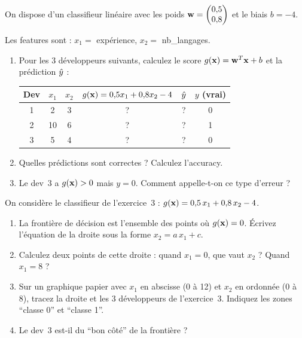 
On dispose d'un classifieur lin\'{e}aire avec les poids
$\mathbf{w} = \begin{pmatrix} 0{,}5 \\ 0{,}8 \end{pmatrix}$ et le biais $b = -4$.

Les features sont : $x_1 = $ exp\'{e}rience, $x_2 = $ nb\_langages.

\begin{enumerate}[label=\alph*)]
    \item Pour les 3 d\'{e}veloppeurs suivants, calculez le score $g(\mathbf{x}) = \mathbf{w}^T\mathbf{x} + b$
        et la pr\'{e}diction $\hat{y}$ :

    \begin{center}
    \renewcommand{\arraystretch}{1.3}
    \begin{tabular}{c|c|c|c|c|c}
        \toprule
        Dev & $x_1$ & $x_2$ & $g(\mathbf{x}) = 0{,}5 x_1 + 0{,}8 x_2 - 4$ & $\hat{y}$ & $y$ (vrai) \\
        \midrule
        1 & 2  & 3 & ? & ? & 0 \\
        2 & 10 & 6 & ? & ? & 1 \\
        3 & 5  & 4 & ? & ? & 0 \\
        \bottomrule
    \end{tabular}
    \end{center}

    \item Quelles pr\'{e}dictions sont correctes ? Calculez l'accuracy.

    \item Le dev~3 a $g(\mathbf{x}) > 0$ mais $y = 0$. Comment appelle-t-on ce type d'erreur ?
\end{enumerate}


On consid\`{e}re le classifieur de l'exercice~3 : $g(\mathbf{x}) = 0{,}5\,x_1 + 0{,}8\,x_2 - 4$.

\begin{enumerate}[label=\alph*)]
    \item La fronti\`{e}re de d\'{e}cision est l'ensemble des points o\`{u} $g(\mathbf{x}) = 0$.
        \'{E}crivez l'\'{e}quation de la droite sous la forme $x_2 = a\,x_1 + c$.

    \item Calculez deux points de cette droite :
        quand $x_1 = 0$, que vaut $x_2$ ? Quand $x_1 = 8$ ?

    \item Sur un graphique papier avec $x_1$ en abscisse (0 \`{a} 12) et $x_2$ en ordonn\'{e}e (0 \`{a} 8),
        tracez la droite et les 3 d\'{e}veloppeurs de l'exercice~3.
        Indiquez les zones ``classe 0'' et ``classe 1''.

    \item Le dev~3 est-il du ``bon c\^{o}t\'{e}'' de la fronti\`{e}re ?
\end{enumerate}

